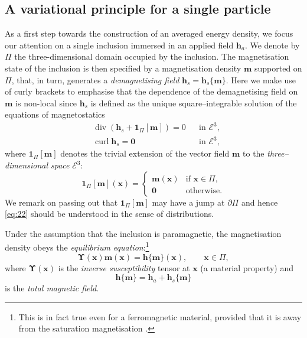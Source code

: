 \documentclass[oneside]{article}
\begin{document}
\subsection{A variational principle for a single particle} 
As a first step towards the construction of an averaged energy density, we focus our attention on a single inclusion immersed in an applied field $\bm h_a$. We denote by $\Pi$ the three-dimensional domain occupied by the inclusion. The magnetisation state of the inclusion is then specified by a magnetisation density $\bm m$ supported on $\Pi$, that, in turn,  generates a \emph{demagnetising field} $\bm h_s=\bm h_s\{\bm m\}$. Here we make use of curly brackets to emphasise that the dependence of the demagnetising field on $\bm m$ is non-local since $\bm h_s$ is defined as the unique square--integrable solution of the equations of magnetostatics
\begin{equation}\label{eq:22}
\begin{aligned}
&\operatorname{div}(\bm h_s+{\bm 1}_{\Pi}[{\bm m}])=0&& \text{in }\mathscr E^3,\\
&\operatorname{curl}\bm h_s=\bm 0 &&\text{in }\mathscr E^3,
\end{aligned}
\end{equation}
where ${\bm 1}_{\Pi}[\bm m]$  denotes the trivial extension of the vector field $\bm m$ to the \emph{three--dimensional space} $\mathscr E^3$:
\begin{equation}
{\bm 1}_\Pi[\bm m](\bm x)=\begin{cases}
\bm m(\bm x)&\text{if }\bm x\in\Pi,\\
\bm 0&\text{otherwise}.
\end{cases}
\end{equation}
We remark on passing out that ${\bm 1}_\Pi[\bm m]$ may have a jump at $\partial\Pi$ and hence \eqref{eq:22} should be understood in the sense of distributions. 

Under the assumption that the inclusion is paramagnetic, the magnetisation density obeys the \emph{equilibrium equation}:\footnote{This is in fact true even for a ferromagnetic material, provided that it is away from the saturation magnetisation \cite{Abbott2007}.}
\begin{equation}\label{eq:1}
\bm\Upsilon(\bm x)\bm m(\bm x)=\bm h\{\bm m\}(\bm x),\qquad \bm x\in\Pi,
\end{equation}
where $\bm\Upsilon(\bm x)$ is the \emph{inverse susceptibility} tensor at $\bm x$ (a material property) and
\begin{equation}\label{eq:7}
\bm h\{\bm m\}=\bm h_a+\bm h_{s}\{\bm m\}
\end{equation}
is the \emph{total magnetic field}.
\end{document}
